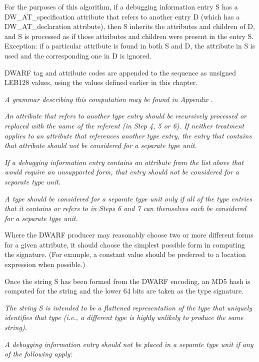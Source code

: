 For the purposes of this algorithm, if a debugging information
entry S has a 
DW\-\_AT\-\_specification 
attribute that refers to
another entry D (which has a 
DW\-\_AT\-\_declaration 
attribute),
then S inherits the attributes and children of D, and S is
processed as if those attributes and children were present in
the entry S. Exception: if a particular attribute is found in
both S and D, the attribute in S is used and the corresponding
one in D is ignored.

DWARF tag and attribute codes are appended to the sequence
as unsigned LEB128 values, using the values defined earlier
in this chapter.

\textit{A grammar describing this computation may be found in
Appendix .
}

\textit{An attribute that refers to another type entry should
be recursively processed or replaced with the name of the
referent (in Step 4, 5 or 6). If neither treatment applies to
an attribute that references another type entry, the entry
that contains that attribute should not be considered for a
separate type unit.}

\textit{If a debugging information entry contains an attribute from
the list above that would require an unsupported form, that
entry should not be considered for a separate type unit.}

\textit{A type should be considered for a separate type unit only
if all of the type entries that it contains or refers to in
Steps 6 and 7 can themselves each be considered for a separate
type unit.}

Where the DWARF producer may reasonably choose two or more
different forms for a given attribute, it should choose
the simplest possible form in computing the signature. (For
example, a constant value should be preferred to a location
expression when possible.)

Once the string S has been formed from the DWARF encoding,
an MD5 hash is computed for the string and the lower 64 bits
are taken as the type signature.

\textit{The string S is intended to be a flattened representation of
the type that uniquely identifies that type (i.e., a different
type is highly unlikely to produce the same string).}

\textit{A debugging information entry should not be placed in a
separate type unit if any of the following apply:}


